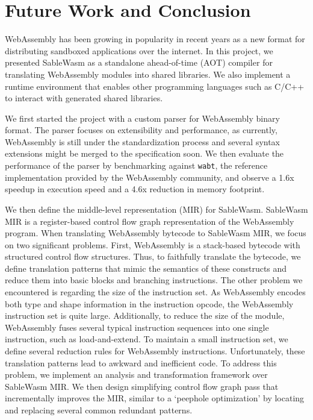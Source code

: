 \chapter{Future Work and Conclusion}

WebAssembly has been growing in popularity in recent years as a new format
for distributing sandboxed applications over the internet. In this project, we
presented SableWasm as a standalone ahead-of-time (AOT) compiler for
translating WebAssembly modules into shared libraries. We also implement a
runtime environment that enables other programming languages such as C/C++ to
interact with generated shared libraries.

We first started the project with a custom parser for WebAssembly binary format.
The parser focuses on extensibility and performance, as currently, WebAssembly
is still under the standardization process and several syntax extensions might
be merged to the specification soon. We then evaluate the performance of the
parser by benchmarking against \texttt{wabt}, the reference implementation
provided by the WebAssembly community, and observe a 1.6x speedup in execution
speed and a 4.6x reduction in memory footprint.

We then define the middle-level representation (MIR) for SableWasm. SableWasm
MIR is a register-based control flow graph representation of the WebAssembly
program. When translating WebAssembly bytecode to SableWasm MIR, we focus on
two significant problems. First, WebAssembly is a stack-based bytecode with
structured control flow structures. Thus, to faithfully translate the bytecode,
we define translation patterns that mimic the semantics of these constructs and
reduce them into basic blocks and branching instructions. The other problem we
encountered is regarding the size of the instruction set. As WebAssembly encodes
both type and shape information in the instruction opcode, the WebAssembly
instruction set is quite large. Additionally, to reduce the size of the module,
WebAssembly fuses several typical instruction sequences into one single
instruction, such as load-and-extend. To maintain a small instruction set, we
define several reduction rules for WebAssembly instructions. Unfortunately,
these translation patterns lead to awkward and inefficient code. To address
this problem, we implement an analysis and transformation framework over
SableWasm MIR. We then design simplifying control flow graph pass that
incrementally improves the MIR, similar to a `peephole optimization' by
locating and replacing several common redundant patterns.

